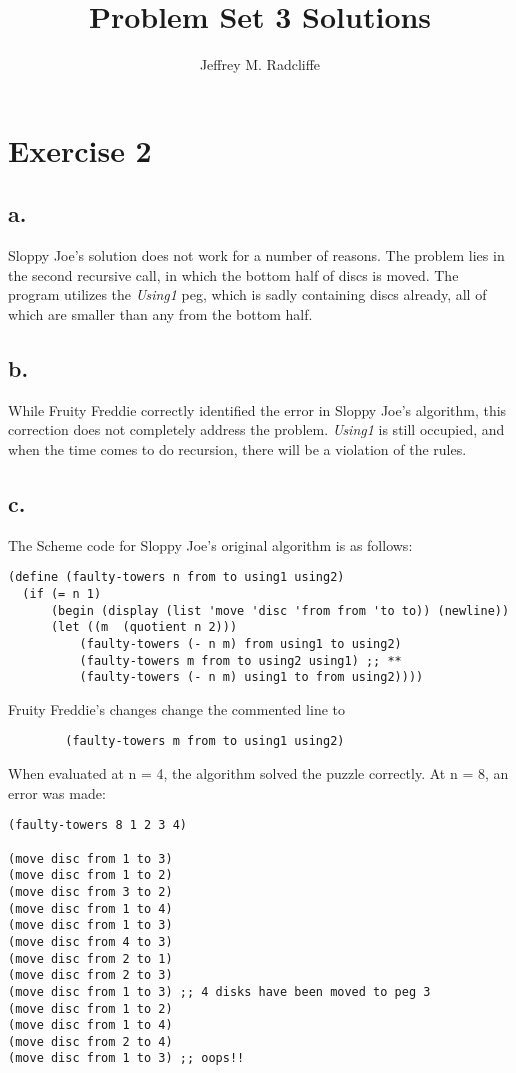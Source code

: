 \documentclass[12pt]{article}
\title{Problem Set 3 Solutions}
\author{Jeffrey M. Radcliffe}
\begin{document}
\maketitle

\section*{Exercise 2}
\subsection*{a.}
Sloppy Joe's solution does not work for a number of reasons. The problem lies
in the second recursive call, in which the bottom half of discs is moved.  The
 program utilizes the \emph{Using1} peg, which is sadly containing discs
 already, all of which are smaller than any from the bottom half.

\subsection*{b.}
While Fruity Freddie correctly identified the error in Sloppy Joe's algorithm,
 this correction does not completely address the problem.  \emph{Using1} is
still occupied, and when the time comes to do recursion, there will be a
violation of the rules.

\subsection*{c.}
The Scheme code for Sloppy Joe's original algorithm is as follows:
\begin{verbatim}
(define (faulty-towers n from to using1 using2)
  (if (= n 1)
      (begin (display (list 'move 'disc 'from from 'to to)) (newline))
      (let ((m  (quotient n 2)))
          (faulty-towers (- n m) from using1 to using2)
          (faulty-towers m from to using2 using1) ;; **
          (faulty-towers (- n m) using1 to from using2))))
\end{verbatim}
Fruity Freddie's changes change the commented line to
\begin{verbatim}
        (faulty-towers m from to using1 using2)
\end{verbatim}
When evaluated at n = 4, the algorithm solved the puzzle correctly. At n = 8, an error was made:
\begin{verbatim}
(faulty-towers 8 1 2 3 4)

(move disc from 1 to 3)
(move disc from 1 to 2)
(move disc from 3 to 2)
(move disc from 1 to 4)
(move disc from 1 to 3)
(move disc from 4 to 3)
(move disc from 2 to 1)
(move disc from 2 to 3)
(move disc from 1 to 3) ;; 4 disks have been moved to peg 3
(move disc from 1 to 2)
(move disc from 1 to 4)
(move disc from 2 to 4)
(move disc from 1 to 3) ;; oops!!
\end{verbatim}
\end{document}
